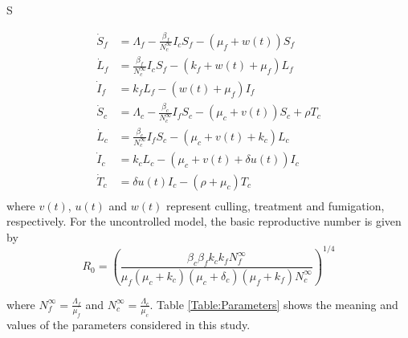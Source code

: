 S\documentclass[preprint,12pt]{elsarticle}
\begin{document}
\begin{equation}\label{Eq:SIvectorhostmodelcontrol}
\begin{aligned}
    \dot{S}_f&= 
        \Lambda_f-\frac{\beta_f}{N_c^{\infty}}I_c S_f-(\mu_f+w(t))S_f
    \\
    \dot{L}_f&= 
        \frac{\beta_f}{N_c^{\infty}} I_c S_f-
        \left(
            k_f + w(t) + \mu_f
        \right) L_f
    \\
    \dot{I}_f&= 
        k_f L_f-(w(t)+\mu_f)I_f
    \\
    \dot{S}_c&= 
        \Lambda_c-\frac{\beta_c}{N_c^{\infty}}I_f S_c-
        \left(
            \mu_c + v(t)
        \right)
        S_c + \rho T_c
    \\
    \dot{L}_c&= 
        \frac{\beta_c}{N_c^{\infty}} I_f S_c - 
        \left(
            \mu_c + v(t) + 
            k_c
        \right)L_c
    \\
    \dot{I}_c&= 
        k_c L_c - 
        (\mu_c + v(t) + \delta u(t))I_c
    \\
    \dot{T}_c&= 
        \delta u(t) I_c - 
        \left(
            \rho  + \mu_c
        \right) T_c
    \\
\end{aligned}
\end{equation}
where $v(t)$, $u(t)$ and $w(t)$ represent culling, treatment and fumigation, respectively.
For the uncontrolled model, the basic reproductive number is given by
  \begin{equation}\label{eq:R0}
     R_0=\left(\frac{\beta_c\beta_f k_c k_fN_f^{\infty}}{\mu_f(\mu_c+k_c)(\mu_c+\delta_c)(\mu_f+k_f)N_c^{\infty}} \right)^{1/4}
 \end{equation}
 
\noindent where $
    \displaystyle
    N_f^{\infty}=\frac{\Lambda_f}{\mu_f}
    $ 
 and 
$
    \displaystyle
    N_c^{\infty} = \frac{\Lambda_c}{\mu_c}
$. Table \ref{Table:Parameters} shows 
 the meaning and values of the parameters considered in this study.
 
\end{document}
